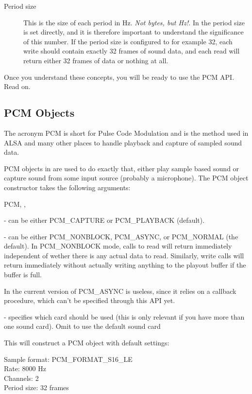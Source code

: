 \begin{description}
\item[Period size] This is the size of each period in Hz. \emph{Not
    bytes, but Hz!.} In  the period size is set
  directly, and it is therefore important to understand the
  significance of this number. If the period size is configured to for
  example 32, each write should contain exactly 32 frames of sound
  data, and each read will return either 32 frames of data or nothing
  at all.

\end{description}

Once you understand these concepts, you will be ready to use the PCM
API. Read on.

\subsection{PCM Objects}
\label{pcm-objects}

The acronym PCM is short for Pulse Code Modulation and is the method
used in ALSA and many other places to handle playback and capture of
sampled sound data.

PCM objects in  are used to do exactly that, either
play sample based sound or capture sound from some input source
(probably a microphone). The PCM object constructor takes the following
arguments:

\begin{classdesc}{PCM}{, , }

 - can be either PCM_CAPTURE or PCM_PLAYBACK (default).

 - can be either PCM_NONBLOCK, PCM_ASYNC, or PCM_NORMAL (the
default).  In PCM_NONBLOCK mode, calls to read will return immediately
independent of wether there is any actual data to read. Similarly,
write calls will return immediately without actually writing anything
to the playout buffer if the buffer is full.

In the current version of  PCM_ASYNC is useless,
since it relies on a callback procedure, which can't be specified through
this API yet.

 - specifies which card should be used (this is only
relevant if you have more than one sound card). Omit to use the
default sound card

This will construct a PCM object with default settings:

Sample format: PCM_FORMAT_S16_LE \\
Rate: 8000 Hz \\
Channels: 2 \\
Period size: 32 frames \\
\end{classdesc}

